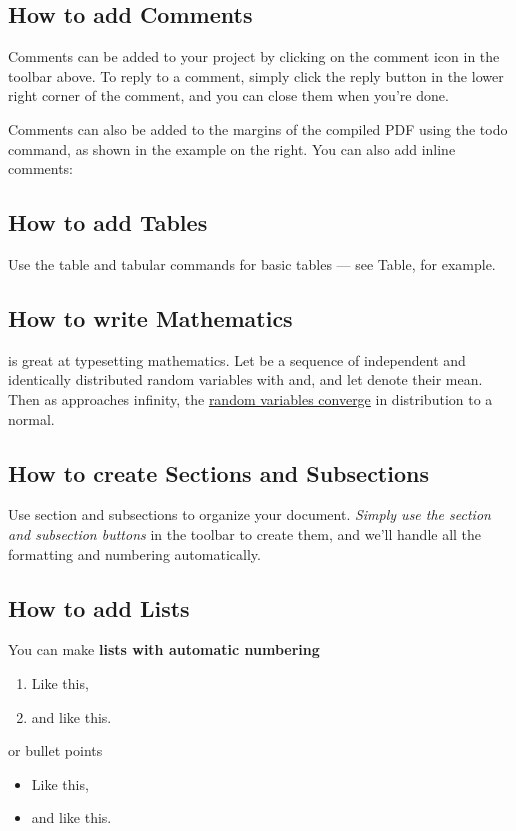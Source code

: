 \documentclass[a4paper]{article}
\begin{document}
\subsection{How to add Comments}

Comments can be added to your project by clicking on the comment icon in the toolbar above. 
To reply to a comment, simply click the reply button in the lower right corner of the comment, and you can close them when you're done.

Comments can also be added to the margins of the compiled PDF using the todo command, as shown in the example on the right. You can also add inline comments:

\subsection{How to add Tables}

Use the table and tabular commands for basic tables --- see Table, for example. 

\subsection{How to write Mathematics}

is great at typesetting mathematics. Let be a sequence of independent and identically distributed random variables with and, and let
denote their mean. Then as approaches infinity, the \underline{random variables converge} in distribution to a normal.


\subsection{How to create Sections and Subsections}

Use section and subsections to organize your document. \textit{Simply use the section and subsection buttons} in the toolbar to create them, and we'll handle all the formatting and numbering automatically.

\subsection{How to add Lists}

You can make \textbf{lists with automatic numbering} 

\begin{enumerate}
\item Like this,
\item and like this.
\end{enumerate}
 or bullet points 
\begin{itemize}
\item Like this,
\item and like this.
\end{itemize}
\end{document}
